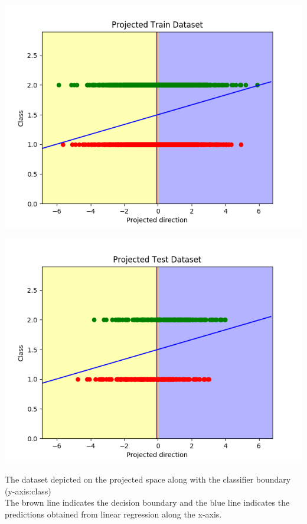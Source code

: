 \documentclass[paper=a4, fontsize=11pt]{scrartcl}
\numberwithin{equation}{section}		%
\numberwithin{figure}{section}			%
\numberwithin{table}{section}				%
\begin{document}
\begin{center}
\includegraphics[scale=0.5]{q1_5}
\end{center}

\begin{center}
\includegraphics[scale=0.5]{q1_6}
\end{center}

The dataset depicted on the projected space along with the classifier boundary (y-axis:class)\\

The brown line indicates the decision boundary and the blue line indicates the predictions obtained from linear regression along the x-axis.
\end{document}
